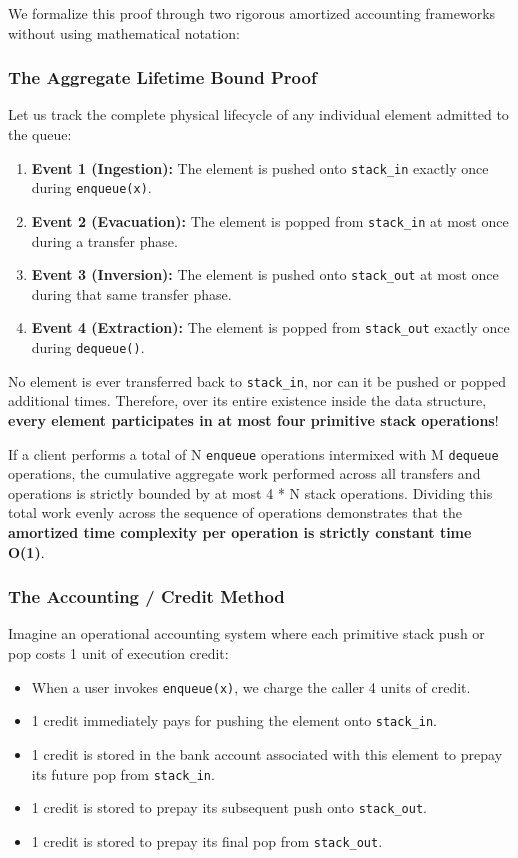 \documentclass[10pt,journal,compsoc,onecolumn]{IEEEtran}
\begin{document}
We formalize this proof through two rigorous amortized accounting frameworks without using mathematical notation:

\subsubsection{The Aggregate Lifetime Bound Proof}
Let us track the complete physical lifecycle of any individual element admitted to the queue:
\begin{enumerate}
    \item \textbf{Event 1 (Ingestion):} The element is pushed onto \texttt{stack\_in} exactly once during \texttt{enqueue(x)}.
    \item \textbf{Event 2 (Evacuation):} The element is popped from \texttt{stack\_in} at most once during a transfer phase.
    \item \textbf{Event 3 (Inversion):} The element is pushed onto \texttt{stack\_out} at most once during that same transfer phase.
    \item \textbf{Event 4 (Extraction):} The element is popped from \texttt{stack\_out} exactly once during \texttt{dequeue()}.
\end{enumerate}

No element is ever transferred back to \texttt{stack\_in}, nor can it be pushed or popped additional times. Therefore, over its entire existence inside the data structure, \textbf{every element participates in at most four primitive stack operations}!

If a client performs a total of N \texttt{enqueue} operations intermixed with M \texttt{dequeue} operations, the cumulative aggregate work performed across all transfers and operations is strictly bounded by at most 4 * N stack operations. Dividing this total work evenly across the sequence of operations demonstrates that the \textbf{amortized time complexity per operation is strictly constant time O(1)}.

\subsubsection{The Accounting / Credit Method}
Imagine an operational accounting system where each primitive stack push or pop costs 1 unit of execution credit:
\begin{itemize}
    \item When a user invokes \texttt{enqueue(x)}, we charge the caller 4 units of credit.
    \item 1 credit immediately pays for pushing the element onto \texttt{stack\_in}.
    \item 1 credit is stored in the bank account associated with this element to prepay its future pop from \texttt{stack\_in}.
    \item 1 credit is stored to prepay its subsequent push onto \texttt{stack\_out}.
    \item 1 credit is stored to prepay its final pop from \texttt{stack\_out}.
\end{itemize}
\end{document}
